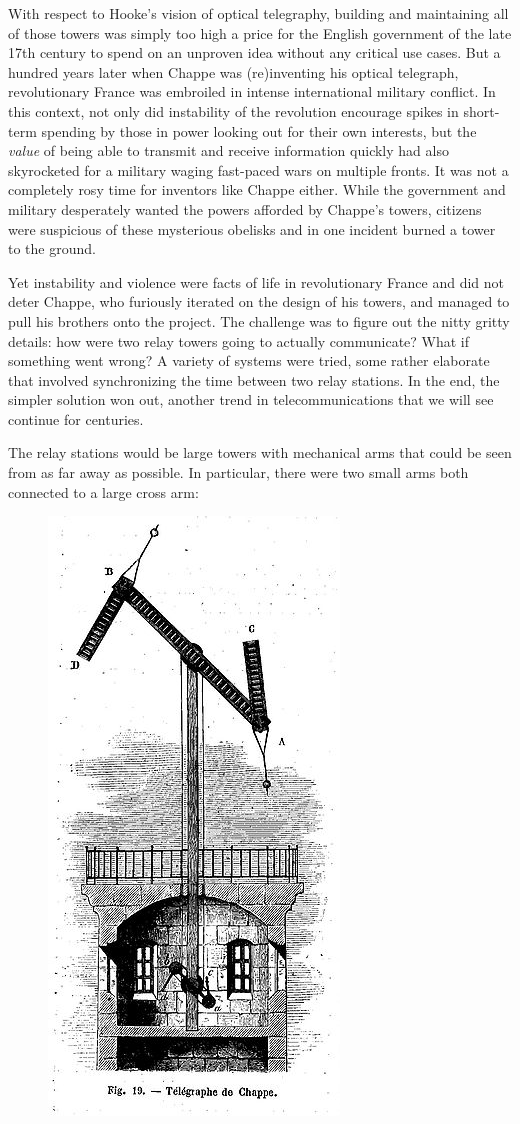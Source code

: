 \documentclass[UTF8]{book}
\begin{document}
\begin{CJK}{UTF8}{gbsn}
With respect to Hooke's vision of optical telegraphy, building and maintaining all of those towers was simply too high a price for the English government of the late 17th century to spend on an unproven idea without any critical use cases. But a hundred years later when Chappe was (re)inventing his optical telegraph, revolutionary France was embroiled in intense international military conflict. In this context, not only did instability of the revolution encourage spikes in short-term spending by those in power looking out for their own interests, but the \emph{value} of being able to transmit and receive information quickly had also skyrocketed for a military waging fast-paced wars on multiple fronts. It was not a completely rosy time for inventors like Chappe either. While the government and military desperately wanted the powers afforded by Chappe's towers, citizens were suspicious of these mysterious obelisks and in one incident burned a tower to the ground.

Yet instability and violence were facts of life in revolutionary France and did not deter Chappe, who furiously iterated on the design of his towers, and managed to pull his brothers onto the project. The challenge was to figure out the nitty gritty details: how were two relay towers going to actually communicate? What if something went wrong? A variety of systems were tried, some rather elaborate that involved synchronizing the time between two relay stations. In the end, the simpler solution won out, another trend in telecommunications that we will see continue for centuries.

The relay stations would be large towers with mechanical arms that could be seen from as far away as possible. In particular, there were two small arms both connected to a large cross arm:

\begin{figure}[H]
\centering
\includegraphics[width=0.3\linewidth]{chappe_tower}
\end{figure}


\end{CJK}
\end{document}
